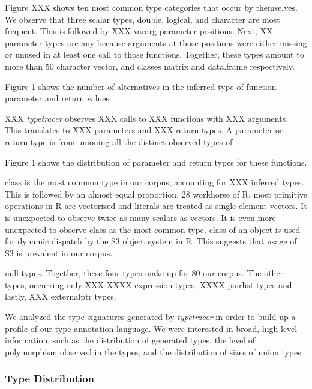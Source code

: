 \documentclass[acmsmall,review,anonymous]{acmart}\settopmatter{printfolios=true,printccs=false,printacmref=false}
\newcommand{\typetracer}{\emph{typetracer}\xspace} %
\begin{document}
Figure XXX shows ten most common type categories that occur by themselves. We
observe that three scalar types, double, logical, and character are most
frequent. This is followed by XXX vararg parameter positions. Next, XX%
parameter types are any because arguments at those positions were either missing
or unused in at least one call to those functions. Together, these types amount
to more than 50%
character vector, and classes matrix and data.frame respectively.

Figure 1 shows the number of alternatives in the inferred type of function
parameter and return values.

XXX%
\typetracer observes XXX calls to XXX functions with XXX arguments. This
translates to XXX parameters and XXX return types. 
A parameter or return type is  from unioning all the distinct observed types of 

Figure 1 shows the distribution of parameter and return types for these
functions.


class is the most common type in our corpus, accounting for XXX%
inferred types. This is followed by an almost equal proportion,
28%
workhorse of R, most primitive operations in R are vectorized and literals are
treated as single element vectors. It is unexpected to observe twice as many
scalars as vectors. It is even more unexpected to observe class as the most
common type. class of an object is used for dynamic dispatch by the S3 object
system in R. This suggests that usage of S3 is prevalent in our corpus.



null types. Together, these four types make up for 80%
our corpus.
The other types, occurring only XXX%
XXXX expression types, XXXX pairlist types and lastly, XXX externalptr types.






We analyzed the type signatures generated by \typetracer in order to build up a profile of our type annotation language.
We were interested in broad, high-level information, such as the distribution of generated types, the level of polymorphism observed in the types, and the distribution of sizes of union types.

%
%
\subsubsection{Type Distribution}
\end{document}
